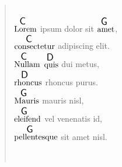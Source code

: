 \documentclass[twocolumn]{article}
\newcommand{\ch}[2]{$\overset{ \resizebox*{!}{1.2\height}{\textsf{#2}} }{\text{#1}}$}
\begin{document}
\begin{verse}
~\\

\ch{Lorem}{C} ipsum dolor sit \ch{amet}{G}, \\
\ch{consectetur}{C} adipiscing elit.\\
\ch{Nullam}{C} \ch{quis}{D} dui metus, \\
\ch{rhoncus}{D} rhoncus purus. \\
\ch{Mauris}{G} mauris nisl, \\
\ch{eleifend}{G} vel venenatis id, \\
\ch{pellentesque}{G} sit amet nisl.

~\\

\end{verse}
\end{document}
